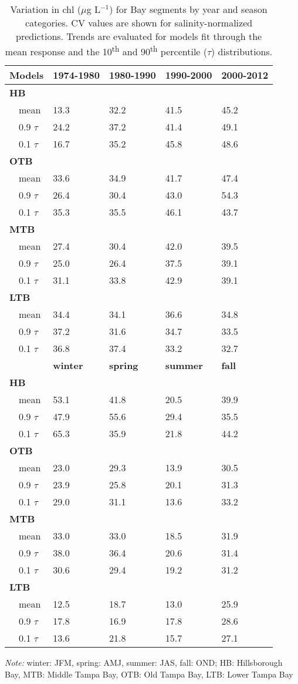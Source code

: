 \documentclass[letterpaper,12pt,oneside]{article}\usepackage{graphicx, color}
\newcommand{\mugl}{$\mu$g L$^{-1}$}
\begin{document}
%
\begin{table}[!tbp]
\caption{Variation in \ac{chl} (\mugl) for Bay segments by year and season categories. \ac{CV} values are shown for salinity-normalized predictions.  Trends are evaluated for models fit through the mean response and the 10\textsuperscript{th} and 90\textsuperscript{th} percentile ($\tau$) distributions.\label{tab:nrmcv}} 
\begin{center}
\begin{tabular}{lllll}
\hline\hline
\multicolumn{1}{l}{{\bf Models}}&\multicolumn{1}{c}{{\bf 1974-1980}}&\multicolumn{1}{c}{{\bf 1980-1990}}&\multicolumn{1}{c}{{\bf 1990-2000}}&\multicolumn{1}{c}{{\bf 2000-2012}}\tabularnewline
\hline
{\bfseries HB}&&&&\tabularnewline
~~mean&13.3&32.2&41.5&45.2\tabularnewline
~~0.9 $\tau$&24.2&37.2&41.4&49.1\tabularnewline
~~0.1 $\tau$&16.7&35.2&45.8&48.6\tabularnewline
\hline
{\bfseries OTB}&&&&\tabularnewline
~~mean&33.6&34.9&41.7&47.4\tabularnewline
~~0.9 $\tau$&26.4&30.4&43.0&54.3\tabularnewline
~~0.1 $\tau$&35.3&35.5&46.1&43.7\tabularnewline
\hline
{\bfseries MTB}&&&&\tabularnewline
~~mean&27.4&30.4&42.0&39.5\tabularnewline
~~0.9 $\tau$&25.0&26.4&37.5&39.1\tabularnewline
~~0.1 $\tau$&31.1&33.8&42.9&39.1\tabularnewline
\hline
{\bfseries LTB}&&&&\tabularnewline
~~mean&34.4&34.1&36.6&34.8\tabularnewline
~~0.9 $\tau$&37.2&31.6&34.7&33.5\tabularnewline
~~0.1 $\tau$&36.8&37.4&33.2&32.7\tabularnewline
\hline
~~&{\bf winter}&{\bf spring}&{\bf summer}&{\bf fall}\tabularnewline
\hline
{\bfseries HB}&&&&\tabularnewline
~~mean&53.1&41.8&20.5&39.9\tabularnewline
~~0.9 $\tau$&47.9&55.6&29.4&35.5\tabularnewline
~~0.1 $\tau$&65.3&35.9&21.8&44.2\tabularnewline
\hline
{\bfseries OTB}&&&&\tabularnewline
~~mean&23.0&29.3&13.9&30.5\tabularnewline
~~0.9 $\tau$&23.9&25.8&20.1&31.3\tabularnewline
~~0.1 $\tau$&29.0&31.1&13.6&33.2\tabularnewline
\hline
{\bfseries MTB}&&&&\tabularnewline
~~mean&33.0&33.0&18.5&31.9\tabularnewline
~~0.9 $\tau$&38.0&36.4&20.6&31.4\tabularnewline
~~0.1 $\tau$&30.6&29.4&19.2&31.2\tabularnewline
\hline
{\bfseries LTB}&&&&\tabularnewline
~~mean&12.5&18.7&13.0&25.9\tabularnewline
~~0.9 $\tau$&17.8&16.9&17.8&28.6\tabularnewline
~~0.1 $\tau$&13.6&21.8&15.7&27.1\tabularnewline
\hline
\end{tabular}
\end{center}
\footnotesize \textit{Note:} winter: JFM, spring: AMJ, summer: JAS, fall: OND; HB: Hillsborough Bay, MTB: Middle Tampa Bay, OTB: Old Tampa Bay, LTB: Lower Tampa Bay\end{table}
\end{document}
